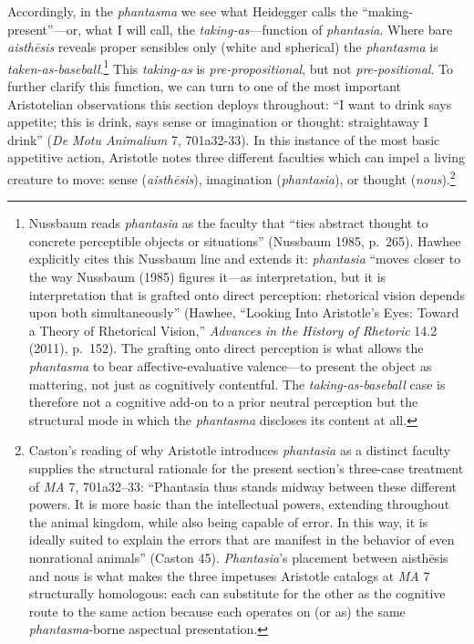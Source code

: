 \documentclass{article}
\begin{document}
Accordingly, in the \textit{phantasma} we see what Heidegger calls the ``making-present''---or, what I will call, the \textit{taking-as}---function of \textit{phantasia}. Where bare \textit{aisthēsis} reveals proper sensibles only (white and spherical) the \textit{phantasma} is \textit{taken-as-baseball}.\footnote{Nussbaum reads \textit{phantasia} as the faculty that ``ties abstract thought to concrete perceptible objects or situations'' (Nussbaum 1985, p.~265). Hawhee explicitly cites this Nussbaum line and extends it: \textit{phantasia} ``moves closer to the way Nussbaum (1985) figures it---as interpretation, but it is interpretation that is grafted onto direct perception: rhetorical vision depends upon both simultaneously'' (Hawhee, ``Looking Into Aristotle's Eyes: Toward a Theory of Rhetorical Vision,'' \textit{Advances in the History of Rhetoric} 14.2 (2011), p.~152). The grafting onto direct perception is what allows the \textit{phantasma} to bear affective-evaluative valence---to present the object as mattering, not just as cognitively contentful. The \textit{taking-as-baseball} case is therefore not a cognitive add-on to a prior neutral perception but the structural mode in which the \textit{phantasma} discloses its content at all.} This \textit{taking-as} is \textit{pre-propositional}, but not \textit{pre-positional}. To further clarify this function, we can turn to one of the most important Aristotelian observations this section deploys throughout: ``I want to drink says appetite; this is drink, says sense or imagination or thought: straightaway I drink'' (\textit{De Motu Animalium} 7, 701a32-33). In this instance of the most basic appetitive action, Aristotle notes three different faculties which can impel a living creature to move: sense (\textit{aisthēsis}), imagination (\textit{phantasia}), or thought (\textit{nous}).\footnote{Caston's reading of why Aristotle introduces \textit{phantasia} as a distinct faculty supplies the structural rationale for the present section's three-case treatment of \textit{MA} 7, 701a32--33: ``Phantasia thus stands midway between these different powers. It is more basic than the intellectual powers, extending throughout the animal kingdom, while also being capable of error. In this way, it is ideally suited to explain the errors that are manifest in the behavior of even nonrational animals'' (Caston 45). \textit{Phantasia}'s placement between aisthēsis and nous is what makes the three impetuses Aristotle catalogs at \textit{MA} 7 structurally homologous: each can substitute for the other as the cognitive route to the same action because each operates on (or as) the same \textit{phantasma}-borne aspectual presentation.} 
\end{document}
